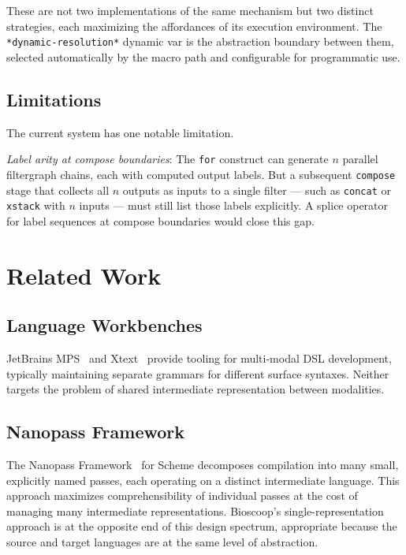 \documentclass[conference]{IEEEtran}
\begin{document}
These are not two implementations of the same mechanism but two distinct strategies, each maximizing the affordances of its execution environment. The \texttt{*dynamic-resolution*} dynamic var is the abstraction boundary between them, selected automatically by the macro path and configurable for programmatic use.

\subsection{Limitations}

The current system has one notable limitation.

\emph{Label arity at compose boundaries}: The \texttt{for} construct can generate $n$ parallel filtergraph chains, each with computed output labels. But a subsequent \texttt{compose} stage that collects all $n$ outputs as inputs to a single filter --- such as \texttt{concat} or \texttt{xstack} with $n$ inputs --- must still list those labels explicitly. A splice operator for label sequences at compose boundaries would close this gap.

\section{Related Work}

\subsection{Language Workbenches}

JetBrains MPS~\cite{mps} and Xtext~\cite{xtext} provide tooling for multi-modal DSL development, typically maintaining separate grammars for different surface syntaxes. Neither targets the problem of shared intermediate representation between modalities.

\subsection{Nanopass Framework}

The Nanopass Framework~\cite{nanopass} for Scheme decomposes compilation into many small, explicitly named passes, each operating on a distinct intermediate language. This approach maximizes comprehensibility of individual passes at the cost of managing many intermediate representations. Bioscoop's single-representation approach is at the opposite end of this design spectrum, appropriate because the source and target languages are at the same level of abstraction.
\end{document}
